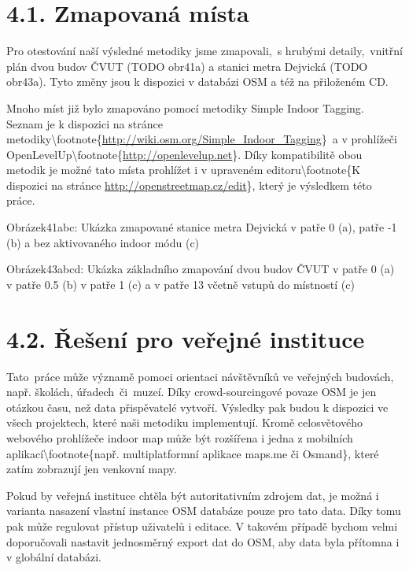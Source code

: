 \section{4.1. Zmapovaná místa}\label{zmapovanuxe1-muxedsta}

Pro otestování naší výsledné metodiky jsme zmapovali,~s hrubými detaily,~vnitřní plán dvou budov ČVUT (TODO obr41a) a stanici metra Dejvická (TODO obr43a). Tyto změny jsou k dispozici v databázi OSM a též na přiloženém CD.

Mnoho míst již bylo zmapováno pomocí metodiky Simple Indoor Tagging. Seznam je k dispozici na stránce metodiky\textbackslash{}footnote\{\href{}{http://wiki.osm.org/Simple\_Indoor\_Tagging}\}~a v prohlížeči OpenLevelUp\textbackslash{}footnote\{\href{}{http://openlevelup.net}\}. Díky kompatibilitě obou metodik je možné tato místa prohlížet i v upraveném editoru\textbackslash{}footnote\{K dispozici na stránce \href{}{http://openstreetmap.cz/edit}\}, který je výsledkem této práce.

Obrázek41abc: Ukázka zmapované stanice metra Dejvická v patře 0 (a), patře -1 (b) a bez aktivovaného indoor módu (c)

Obrázek43abcd: Ukázka základního zmapování dvou budov ČVUT v patře 0 (a) v patře 0.5 (b) v patře 1 (c) a v patře 13 včetně vstupů do místností (c)

\section{4.2. Řešení pro veřejné instituce}\label{ux159eux161enuxed-pro-veux159ejnuxe9-instituce}

Tato~práce může významě pomoci orientaci návštěvníků ve veřejných budovách, např. školách, úřadech~či~muzeí. Díky crowd-sourcingové povaze OSM je jen otázkou času, než data přispěvatelé vytvoří. Výsledky pak budou k dispozici ve všech projektech, které naši metodiku implementují. Kromě celosvětového webového prohlížeče indoor map může být rozšířena i jedna z mobilních aplikací\textbackslash{}footnote\{např. multiplatformní aplikace maps.me či Osmand\}, které zatím zobrazují jen venkovní mapy.

Pokud by veřejná instituce chtěla být autoritativním zdrojem dat, je možná i varianta nasazení vlastní instance OSM databáze pouze pro tato data. Díky tomu pak může regulovat přístup uživatelů i editace. V takovém případě bychom velmi doporučovali nastavit jednosměrný export dat do OSM, aby data byla přítomna i v globální databázi.

